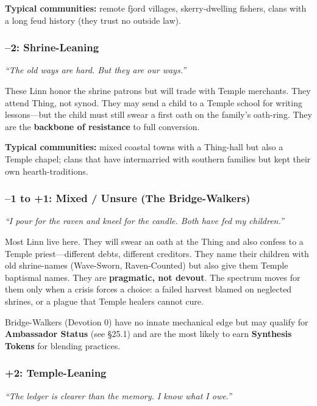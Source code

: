 \documentclass[11pt]{article}
\begin{document}
\textbf{Typical communities:} remote fjord villages, skerry-dwelling fishers, clans with a long feud history (they trust no outside law).

\subsubsection{--2: Shrine-Leaning}

\emph{``The old ways are hard. But they are \textit{our} ways.''}

These Linn honor the shrine patrons but will trade with Temple merchants. They attend Thing, not synod. They may send a child to a Temple school for writing lessons---but the child must still swear a first oath on the family's oath-ring. They are the \textbf{backbone of resistance} to full conversion.

\textbf{Typical communities:} mixed coastal towns with a Thing-hall but also a Temple chapel; clans that have intermarried with southern families but kept their own hearth-traditions.

\subsubsection{--1 to +1: Mixed / Unsure (The Bridge-Walkers)}

\emph{``I pour for the raven and kneel for the candle. Both have fed my children.''}

Most Linn live here. They will swear an oath at the Thing and also confess to a Temple priest---different debts, different creditors. They name their children with old shrine-names (Wave-Sworn, Raven-Counted) but also give them Temple baptismal names. They are \textbf{pragmatic, not devout}. The spectrum moves for them only when a crisis forces a choice: a failed harvest blamed on neglected shrines, or a plague that Temple healers cannot cure.

\begin{mechanicbox}
Bridge-Walkers (Devotion 0) have no innate mechanical edge but may qualify for \textbf{Ambassador Status} (see §25.1) and are the most likely to earn \textbf{Synthesis Tokens} for blending practices.
\end{mechanicbox}

\subsubsection{+2: Temple-Leaning}

\emph{``The ledger is clearer than the memory. I know what I owe.''}
\end{document}

